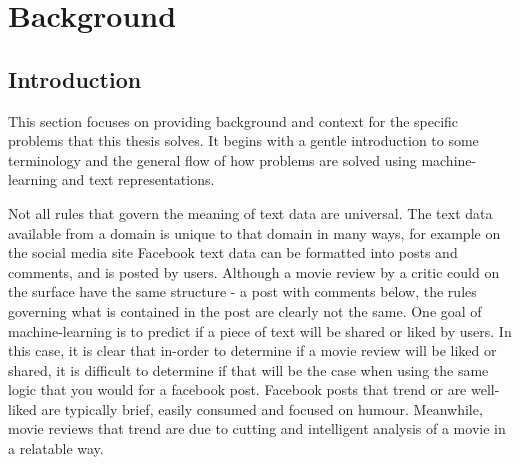 \chapter{Background}




\section{Introduction}


This section focuses on providing background and context for the specific problems that this thesis solves. It begins with a gentle introduction to some terminology and the general flow of how problems are solved using machine-learning and text representations.




Not all rules that govern the meaning of text data are universal. The text data available from a domain is unique to that domain in many ways, for example on the social media site Facebook text data can be formatted into posts and comments, and is posted by users. Although a movie review by a critic could on the surface have the same structure - a post with comments below, the rules governing what is contained in the post are clearly not the same. One goal of machine-learning is to predict if a piece of text will be shared or liked by users. In this case, it is clear that in-order to determine if a movie review will be liked or shared, it is difficult to determine if that will be the case when using the same logic that you would for a facebook post. Facebook posts that trend or are well-liked are typically brief, easily consumed and focused on humour. Meanwhile, movie reviews that trend are due to cutting and intelligent analysis of a movie in a relatable way. %

